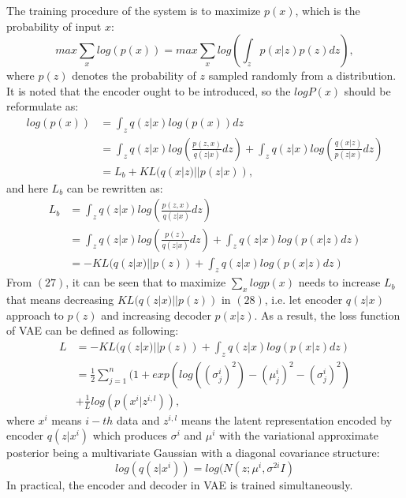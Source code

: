 \documentclass[conference]{IEEEtran}
\begin{document}
The training procedure of the system is to maximize $p(x)$, which is the probability of input $x$:
\begin{equation}
    max \sum_x log(p(x)) = max \sum_x log(\int_zp(x|z)p(z)dz),
\end{equation}
where $p(z)$ denotes the probability of $z$ sampled randomly from a distribution. It is noted that the encoder ought to be introduced, so the $logP(x)$ should be reformulate as:
\begin{equation}
    \begin{split}
        log(p(x)) &= \int_zq(z|x)log(p(x))dz\\
        &= \int_zq(z|x)log(\frac{p(z,x)}{q(z|x)}dz) + \int_zq(z|x)log(\frac{q(x|z)}{p(z|x)}dz)\\
        &= L_b + KL(q(x|z)||p(z|x)),
    \end{split}
\end{equation}
and here $L_b$ can be rewritten as:
\begin{equation}
    \begin{split}
        L_b &= \int_zq(z|x)log(\frac{p(z,x)}{q(z|x)}dz)\\
        &= \int_zq(z|x)log(\frac{p(z)}{q(z|x)}dz) + \int_zq(z|x)log(p(x|z)dz)\\
        &=-KL(q(z|x)||p(z)) + \int_zq(z|x)log(p(x|z)dz)
    \end{split}
\end{equation}
From $(27)$, it can be seen that to maximize $\sum_x logp(x)$ needs to increase $L_b$ that means decreasing $KL(q(z|x)||p(z))$ in $(28)$, i.e. let encoder $q(z|x)$ approach to $p(z)$ and increasing decoder $p(x|z)$. As a result, the loss function of VAE can be defined as following:
\begin{equation}
    \begin{split}
        L &= -KL(q(z|x)||p(z)) + \int_zq(z|x)log(p(x|z)dz)\\
        &= \frac{1}{2} \sum_{j=1}^n (1+exp(log((\sigma_j^i)^2)-(\mu_j^i)^2-(\sigma_j^i)^2)\\
        &+\frac{1}{L}log(p(x^i|z^{i,l})),
    \end{split}
\end{equation}
where $x^i$ means $i-th$ data and $z^{i,l}$ means the latent representation encoded by encoder $q(z|x^i)$ which produces $\sigma^i$ and $\mu^i$ with the variational approximate posterior being a multivariate Gaussian with a diagonal covariance structure:
\begin{equation}
    log(q(z|x^i))= log(N(z;\mu^i,\sigma^{2i}I)
\end{equation}
In practical, the encoder and decoder in VAE is trained simultaneously.
\end{document}
